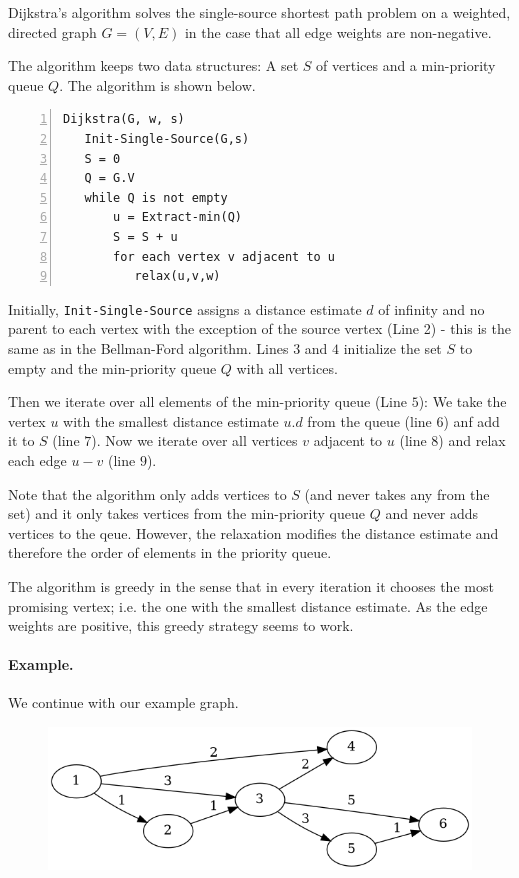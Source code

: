 
Dijkstra's algorithm solves the single-source shortest path problem on a weighted, directed graph $G=(V,E)$ in the case that all edge weights are non-negative.

The algorithm keeps two data structures: A set $S$ of vertices and a min-priority queue $Q$. The algorithm is shown below.

\begin{Verbatim}[numbers=left, xleftmargin=5mm]
Dijkstra(G, w, s)
   Init-Single-Source(G,s)
   S = 0
   Q = G.V
   while Q is not empty
       u = Extract-min(Q)
       S = S + u
       for each vertex v adjacent to u
          relax(u,v,w)
\end{Verbatim}

Initially, \verb|Init-Single-Source| assigns a distance estimate $d$ of infinity and no parent to each vertex with the exception of the source vertex (Line 2) - this is the same as in the Bellman-Ford algorithm. Lines $3$ and $4$ initialize the set $S$ to empty and the min-priority queue $Q$ with all vertices.

Then we iterate over all elements of the min-priority queue (Line $5$): We take the vertex $u$ with the smallest distance estimate $u.d$ from the queue (line $6$) anf add it to $S$ (line $7$). Now we iterate over all vertices $v$ adjacent to $u$ (line $8$) and relax each edge $u-v$ (line $9$).

Note that the algorithm only adds vertices to $S$ (and never takes any from the set) and it only takes vertices from the min-priority queue $Q$ and never adds vertices to the qeue. However, the relaxation modifies the distance estimate and therefore the order of elements in the priority queue.

The algorithm is greedy in the sense that in every iteration it chooses the most promising vertex; i.e. the one with the smallest distance estimate. As the edge weights are positive, this greedy strategy seems to work.  

\paragraph{Example.} We continue with our example graph.

\begin{figure}[H]
\centering
\includegraphics[scale=0.5]{images/dijkstra_1.png}
\end{figure}

